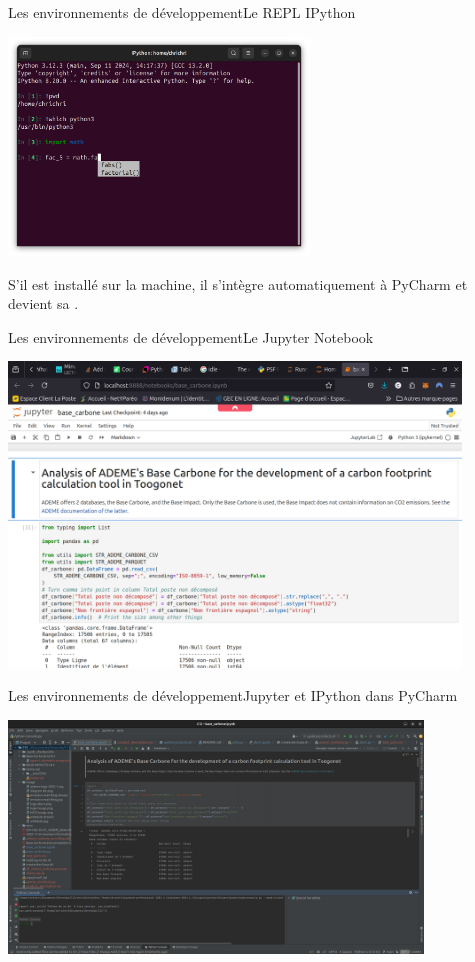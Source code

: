 \documentclass{beamer}
\begin{document}
    \begin{frame}{Les environnements de développement}{Le REPL IPython}
        \begin{center}
            \includegraphics[width=8cm]{image/repl}
        \end{center}
        S'il est installé sur la machine, il s'intègre automatiquement à PyCharm et devient sa .
    \end{frame}

    \begin{frame}{Les environnements de développement}{Le Jupyter Notebook}
        \begin{center}
            \includegraphics[width=12cm]{image/jupyter-notebook}
        \end{center}
    \end{frame}

    \begin{frame}{Les environnements de développement}{Jupyter et IPython dans PyCharm}
        \begin{center}
            \includegraphics[width=11cm]{image/pycharm-notebook-repl}
        \end{center}
    \end{frame}
\end{document}
